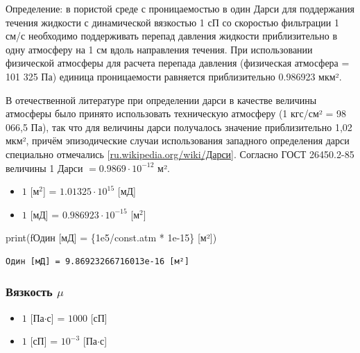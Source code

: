 \documentclass[
  russian,
  letterpaper,
  DIV=11,
  numbers=noendperiod,
  oneside]{scrartcl}
\newenvironment{Shaded}{\begin{snugshade}}{\end{snugshade}}
\newcommand{\BuiltInTok}[1]{\textcolor[rgb]{0.00,0.23,0.31}{#1}}
\newcommand{\FloatTok}[1]{\textcolor[rgb]{0.68,0.00,0.00}{#1}}
\newcommand{\NormalTok}[1]{\textcolor[rgb]{0.00,0.23,0.31}{#1}}
\newcommand{\OperatorTok}[1]{\textcolor[rgb]{0.37,0.37,0.37}{#1}}
\newcommand{\SpecialCharTok}[1]{\textcolor[rgb]{0.37,0.37,0.37}{#1}}
\newcommand{\SpecialStringTok}[1]{\textcolor[rgb]{0.13,0.47,0.30}{#1}}
\providecommand{\tightlist}{%
  \setlength{\itemsep}{0pt}\setlength{\parskip}{0pt}}
\begin{document}
Определение: в пористой среде с проницаемостью в один Дарси для
поддержания течения жидкости с динамической вязкостью 1 сП со скоростью
фильтрации 1 см/с необходимо поддерживать перепад давления жидкости
приблизительно в одну атмосферу на 1 см вдоль направления течения. При
использовании физической атмосферы для расчета перепада давления
(физическая атмосфера = 101 325 Па) единица проницаемости равняется
приблизительно 0.986923 мкм².

В отечественной литературе при определении дарси в качестве величины
атмосферы было принято использовать техническую атмосферу (1 кгс/см² =
98 066,5 Па), так что для величины дарси получалось значение
приблизительно 1,02 мкм², причём эпизодические случаи использования
западного определения дарси специально отмечались
{[}\href{https://ru.wikipedia.org/wiki/\%D0\%94\%D0\%B0\%D1\%80\%D1\%81\%D0\%B8}{ru.wikipedia.org/wiki/Дарси}{]}.
Согласно ГОСТ 26450.2-85 величины 1 Дарси \(= 0.9869⋅10^{−12}\) м².

\begin{itemize}
\tightlist
\item
  \(1\) {[}м\(^2\){]} = \(1.01325 \cdot 10^{15}\) {[}мД{]}
\item
  \(1\) {[}мД{]} = \(0.986923 \cdot 10^{-15}\) {[}м\(^2\){]}
\end{itemize}

\begin{Shaded}
\begin{Highlighting}[]
\BuiltInTok{print}\NormalTok{(}\SpecialStringTok{f\textquotesingle{}Один [мД] = }\SpecialCharTok{\{}\FloatTok{1e5}\OperatorTok{/}\NormalTok{const}\SpecialCharTok{.}\NormalTok{atm }\OperatorTok{*} \FloatTok{1e{-}15}\SpecialCharTok{\}}\SpecialStringTok{ [м²]\textquotesingle{}}\NormalTok{)}
\end{Highlighting}
\end{Shaded}

\begin{verbatim}
Один [мД] = 9.86923266716013e-16 [м²]
\end{verbatim}

\subsubsection{\texorpdfstring{Вязкость
\(\mu\)}{Вязкость \textbackslash mu}}\label{ux432ux44fux437ux43aux43eux441ux442ux44c-mu}

\begin{itemize}
\tightlist
\item
  \(1\) {[}Па\(\cdot\)с{]} = \(1000\) {[}сП{]}
\item
  \(1\) {[}сП{]} = \(10^{-3}\) {[}Па\(\cdot\)с{]}
\end{itemize}
\end{document}
